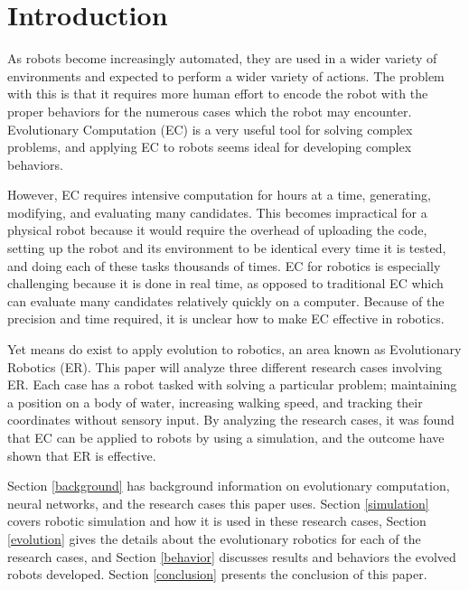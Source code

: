 \documentclass{sig-alternate}
\begin{document}


	
\section{Introduction}
 As robots become increasingly automated, they are used in a wider variety of environments and expected to perform a wider variety of actions. The problem with this is that it requires more human effort to encode the robot with the proper behaviors for the numerous cases which the robot may encounter. Evolutionary Computation (EC) is a very useful tool for solving complex problems, and applying EC to robots seems ideal for developing complex behaviors. 
 
 However, EC requires intensive computation for hours at a time, generating, modifying, and evaluating many candidates. This becomes impractical for a physical robot because it would require the overhead of uploading the code, setting up the robot and its environment to be identical every time it is tested, and doing each of these tasks thousands of times. EC for robotics is especially challenging because it is done in real time, as opposed to traditional EC which can evaluate many candidates relatively quickly on a computer. Because of the precision and time required, it is unclear how to make EC effective in robotics.
 
 Yet means do exist to apply evolution to robotics, an area known as Evolutionary Robotics (ER). This paper will analyze three different research cases involving ER. Each case has a robot tasked with solving a particular problem; maintaining a position on a body of water, increasing walking speed, and tracking their coordinates without sensory input. By analyzing the research cases, it was found that EC can be applied to robots by using a simulation, and the outcome have shown that ER is effective.

   Section \ref{background}  has  background information on evolutionary computation, neural networks, and the research cases this paper uses. Section \ref{simulation} covers robotic simulation and how it is used in these research cases, Section \ref{evolution} gives the details about the evolutionary robotics for each of the research cases, and Section \ref{behavior} discusses results and behaviors the evolved robots developed. Section \ref{conclusion} presents the conclusion of this paper.
 
\end{document}
